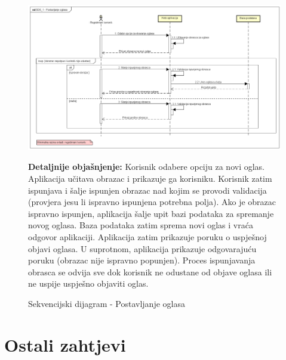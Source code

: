 \begin{figure}[hp!]
	\centering
	\includegraphics[width=\textwidth]{slike/SD6_1 - Postavljanje oglasa.png}
	\caption{Sekvencijski dijagram - Postavljanje oglasa}
	\begin{flushleft}
		\textbf{Detaljnije objašnjenje:}
		Korisnik odabere opciju za novi oglas. Aplikacija učitava obrazac i prikazuje ga korisniku. Korisnik zatim ispunjava i šalje ispunjen obrazac nad kojim se provodi validacija (provjera jesu li ispravno ispunjena potrebna polja). Ako je obrazac ispravno ispunjen, aplikacija šalje upit bazi podataka za spremanje novog oglasa. Baza podataka zatim sprema novi oglas i vraća odgovor aplikaciji. Aplikacija zatim prikazuje poruku o uspješnoj objavi oglasa. U suprotnom, aplikacija prikazuje odgovarajuću poruku (obrazac nije ispravno popunjen). Proces ispunjavanja obrasca se odvija sve dok korisnik ne odustane od objave oglasa ili ne uspije uspješno objaviti oglas.
	\end{flushleft}
\end{figure}
\eject

\section{Ostali zahtjevi}


